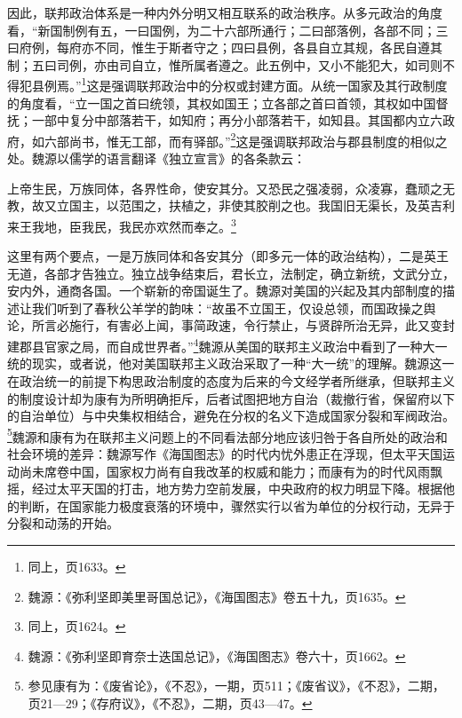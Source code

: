 \documentclass[a4paper, 12pt, openright]{ctexbook}
\renewenvironment{quote}
  {\list{}{\rightmargin2\ccwd \leftmargin2\ccwd \itemindent=2\ccwd \listparindent=2\ccwd}%
   \item\relax\small\kaishu\color{black}}
  {\endlist}
\begin{document}
因此，联邦政治体系是一种内外分明又相互联系的政治秩序。从多元政治的角度看，“新国制例有五，一曰国例，为二十六部所通行；二曰部落例，各部不同；三曰府例，每府亦不同，惟生于斯者守之；四曰县例，各县自立其规，各民自遵其制；五曰司例，亦由司自立，惟所属者遵之。此五例中，又小不能犯大，如司则不得犯县例焉。”\footnote{同上，页1633。}这是强调联邦政治中的分权或封建方面。从统一国家及其行政制度的角度看，“立一国之首曰统领，其权如国王；立各部之首曰首领，其权如中国督抚；一部中复分中部落若干，如知府；再分小部落若干，如知县。其国都内立六政府，如六部尚书，惟无工部，而有驿部。”\footnote{魏源：《弥利坚即美里哥国总记》，《海国图志》卷五十九，页1635。}这是强调联邦政治与郡县制度的相似之处。魏源以儒学的语言翻译《独立宣言》的各条款云：

\begin{quote}
上帝生民，万族同体，各界性命，使安其分。又恐民之强凌弱，众凌寡，蠢顽之无教，故又立国主，以范围之，扶植之，非使其胶削之也。我国旧无渠长，及英吉利来王我地，臣我民，我民亦欢然而奉之。\footnote{同上，页1624。}
\end{quote}

这里有两个要点，一是万族同体和各安其分（即多元一体的政治结构），二是英王无道，各部才告独立。独立战争结束后，君长立，法制定，确立新统，文武分立，安内外，通商各国。一个崭新的帝国诞生了。魏源对美国的兴起及其内部制度的描述让我们听到了春秋公羊学的韵味：“故虽不立国王，仅设总领，而国政操之舆论，所言必施行，有害必上闻，事简政速，令行禁止，与贤辟所治无异，此又变封建郡县官家之局，而自成世界者。”\footnote{魏源：《弥利坚即育奈士迭国总记》，《海国图志》卷六十，页1662。}魏源从美国的联邦主义政治中看到了一种大一统的现实，或者说，他对美国联邦主义政治采取了一种“大一统”的理解。魏源这一在政治统一的前提下构思政治制度的态度为后来的今文经学者所继承，但联邦主义的制度设计却为康有为所明确拒斥，后者试图把地方自治（裁撤行省，保留府以下的自治单位）与中央集权相结合，避免在分权的名义下造成国家分裂和军阀政治。\footnote{参见康有为：《废省论》，《不忍》，一期，页511；《废省议》，《不忍》，二期，页21—29；《存府议》，《不忍》，二期，页43—47。}魏源和康有为在联邦主义问题上的不同看法部分地应该归咎于各自所处的政治和社会环境的差异：魏源写作《海国图志》的时代内忧外患正在浮现，但太平天国运动尚未席卷中国，国家权力尚有自我改革的权威和能力；而康有为的时代风雨飘摇，经过太平天国的打击，地方势力空前发展，中央政府的权力明显下降。根据他的判断，在国家能力极度衰落的环境中，骤然实行以省为单位的分权行动，无异于分裂和动荡的开始。
\end{document}
